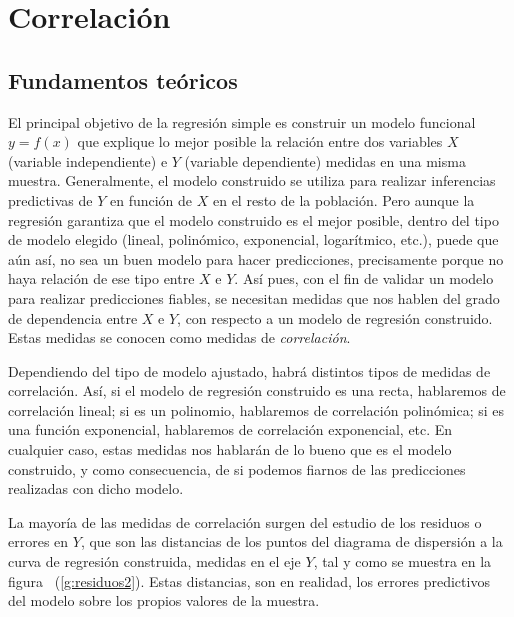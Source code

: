 
\chapter{Correlación}

\section{Fundamentos teóricos}
El principal objetivo de la regresión simple es construir un modelo funcional
$y=f(x)$ que explique lo mejor posible la relación entre dos variables $X$
(variable independiente) e $Y$ (variable dependiente) medidas en una misma
muestra. Generalmente, el modelo construido se utiliza para realizar
inferencias predictivas de $Y$ en función de $X$ en el resto de la población.
Pero aunque la regresión garantiza que el modelo construido es el mejor
posible, dentro del tipo de modelo elegido (lineal, polinómico, exponencial,
logarítmico, etc.), puede que aún así, no sea un buen modelo para hacer
predicciones, precisamente porque no haya relación de ese tipo entre $X$ e
$Y$. Así pues, con el fin de validar un modelo para realizar predicciones
fiables, se necesitan medidas que nos hablen del grado de dependencia entre $X$ e
$Y$, con respecto a un modelo de regresión construido. Estas medidas se conocen
como medidas de \emph{correlación}.

Dependiendo del tipo de modelo ajustado, habrá distintos tipos de medidas de
correlación. Así, si el modelo de regresión construido es una recta,
hablaremos de correlación lineal; si es un polinomio, hablaremos de correlación
polinómica; si es una función exponencial, hablaremos de correlación
exponencial, etc. En cualquier caso, estas medidas nos hablarán de lo bueno
que es el modelo construido, y como consecuencia, de si podemos fiarnos de las
predicciones realizadas con dicho modelo.

La mayoría de las medidas de correlación surgen del estudio de los residuos o
errores en $Y$, que son las distancias de los puntos del diagrama de
dispersión a la curva de regresión construida, medidas en el eje $Y$, tal y
como se muestra en la figura ~(\ref{g:residuos2}). Estas distancias, son en
realidad, los errores predictivos del modelo sobre los propios valores de la
muestra.

